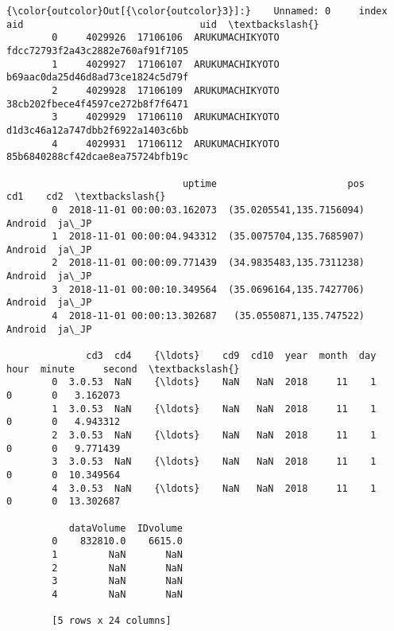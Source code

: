 \documentclass[11pt]{article}
\begin{document}
\begin{Verbatim}[commandchars=\\\{\}]
{\color{outcolor}Out[{\color{outcolor}3}]:}    Unnamed: 0     index              aid                               uid  \textbackslash{}
        0     4029926  17106106  ARUKUMACHIKYOTO  fdcc72793f2a43c2882e760af91f7105   
        1     4029927  17106107  ARUKUMACHIKYOTO  b69aac0da25d46d8ad73ce1824c5d79f   
        2     4029928  17106109  ARUKUMACHIKYOTO  38cb202fbece4f4597ce272b8f7f6471   
        3     4029929  17106110  ARUKUMACHIKYOTO  d1d3c46a12a747dbb2f6922a1403c6bb   
        4     4029931  17106112  ARUKUMACHIKYOTO  85b6840288cf42dcae8ea75724bfb19c   
        
                               uptime                       pos      cd1    cd2  \textbackslash{}
        0  2018-11-01 00:00:03.162073  (35.0205541,135.7156094)  Android  ja\_JP   
        1  2018-11-01 00:00:04.943312  (35.0075704,135.7685907)  Android  ja\_JP   
        2  2018-11-01 00:00:09.771439  (34.9835483,135.7311238)  Android  ja\_JP   
        3  2018-11-01 00:00:10.349564  (35.0696164,135.7427706)  Android  ja\_JP   
        4  2018-11-01 00:00:13.302687   (35.0550871,135.747522)  Android  ja\_JP   
        
              cd3  cd4    {\ldots}    cd9  cd10  year  month  day  hour  minute     second  \textbackslash{}
        0  3.0.53  NaN    {\ldots}    NaN   NaN  2018     11    1     0       0   3.162073   
        1  3.0.53  NaN    {\ldots}    NaN   NaN  2018     11    1     0       0   4.943312   
        2  3.0.53  NaN    {\ldots}    NaN   NaN  2018     11    1     0       0   9.771439   
        3  3.0.53  NaN    {\ldots}    NaN   NaN  2018     11    1     0       0  10.349564   
        4  3.0.53  NaN    {\ldots}    NaN   NaN  2018     11    1     0       0  13.302687   
        
           dataVolume  IDvolume  
        0    832810.0    6615.0  
        1         NaN       NaN  
        2         NaN       NaN  
        3         NaN       NaN  
        4         NaN       NaN  
        
        [5 rows x 24 columns]
\end{Verbatim}
            
\end{document}
